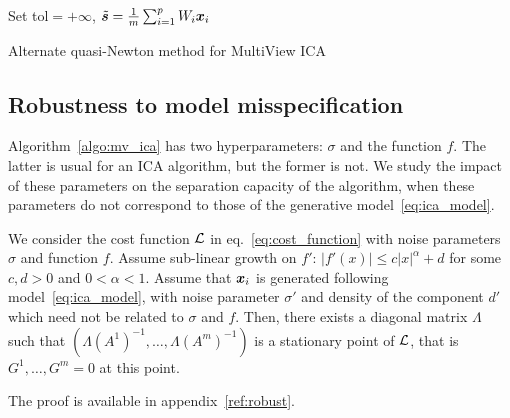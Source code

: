 \begin{algorithm}[H]
\label{algo:mv_ica}
\SetAlgoLined
{}
Set tol$=+\infty$, $\tilde{\boldsymbol{s}} = \frac1m\sum_{i=1}^pW_i\boldsymbol{x}_i$\\
 \caption{Alternate quasi-Newton method for MultiView ICA}
\end{algorithm}
%
%
%
%
\subsection{Robustness to model misspecification}
Algorithm~\ref{algo:mv_ica} has two hyperparameters: $\sigma$ and the function $f$.
%
The latter is usual for an ICA algorithm, but the former is not.
%
We study the impact of these parameters on the separation capacity of the algorithm, when these parameters do not correspond to those of the generative model~\eqref{eq:ica_model}.
%
\begin{proposition}
\label{prop:robust}
We consider the cost function $\mathcal{L}$ in eq.~\eqref{eq:cost_function} with noise parameters $\sigma$ and function $f$.
%
Assume sub-linear growth on $f'$: $|f'(x)|\leq c|x|^{\alpha} + d$ for some $c, d > 0$ and $0<\alpha<1$.
%
Assume that $\boldsymbol{x}_i$ is generated following model~\eqref{eq:ica_model}, with noise parameter $\sigma'$ and density of the component $d'$ which need not be related to $\sigma$ and $f$.
%
Then, there exists a diagonal matrix $\Lambda$ such that $(\Lambda (A^1)^{-1}, \dots, \Lambda (A^m)^{-1})$ is a stationary point of $\mathcal{L}$, that is $G^1,\dots, G^m =0$ at this point.
\end{proposition}
The proof is available in appendix~\ref{ref:robust}.

